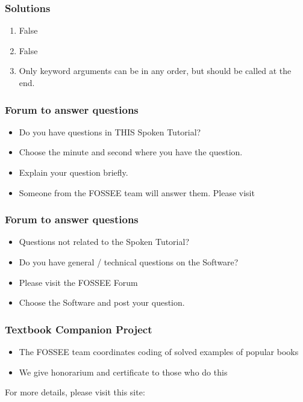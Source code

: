 \documentclass[17pt]{beamer}
\begin{document}
\begin{frame}
\frametitle{Solutions}
\label{sec-14}

\begin{enumerate}
\item False\pause
\vspace{12pt}
\item False\pause
\vspace{12pt}
\item Only keyword arguments can be in any order, 
   but should be called at the end.
\end{enumerate}
\end{frame}
\begin{frame}
\frametitle{Forum to answer questions}
\begin{itemize}
\item Do you have questions in THIS Spoken Tutorial?
\item Choose the minute and second where you have the question.
\item Explain your question briefly.
\item Someone from the FOSSEE team will answer them. Please visit 
\end{itemize}
\begin{center}
{\color{blue}{http://forums.spoken-tutorial.org/}}
 \end{center} 
\end{frame}
\begin{frame}
\frametitle{Forum to answer questions}
\begin{itemize}
\item Questions not related to the Spoken Tutorial?
\item Do you have general / technical questions on the Software?
\item Please visit the FOSSEE Forum
\begin{center}
{\color{blue}{http://forums.fossee.in/}}
 \end{center}
\item Choose the Software and post your question.
\end{itemize}
\end{frame}
\begin{frame}
\frametitle{Textbook Companion Project}
\begin{itemize}
\item The FOSSEE team coordinates coding of solved examples of popular
  books 
\item We give honorarium and certificate to those who do this
\end{itemize}
For more details, please visit this site:
\begin{center}
{\color{blue}{http://tbc-python.fossee.in/}}
\end{center}
\end{frame}
\end{document}

